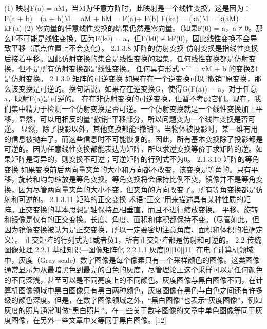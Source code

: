 (1) 映射F(a) = aM，当M为任意方阵时，此映射是一个线性变换，这是因为：
F(a + b)= (a + b)M = aM + bM = F(a)+ F(b)
F(ka) = (ka)M = k(aM) = kF(a)
(2) 零向量的任意线性变换的结果仍然是零向量。（如果F(0) = a，a ≠ 0。那么F不可能是线性变换。因为F(k0) = a，但F(k0) ≠ kF(0)，因此线性变换不会导致平移（原点位置上不会变化）。
2.1.3.8 矩阵的仿射变换
仿射变换是指线性变换后接着平移。因此仿射变换的集合是线性变换的超集，任何线性变换都是仿射变换，但不是所有仿射变换都是线性变换。
任何具有形式 v^'  = vM + b 的变换都是仿射变换。
2.1.3.9 矩阵的可逆变换
如果存在一个逆变换可以“撤销”原变换，那么该变换是可逆的。换句话说，如果存在逆变换G，使得G(F(a)) = a，对于任意a，映射F(a)是可逆的。
存在非仿射变换的可逆变换，但暂不考虑它们。现在，我们集中精力于检测一个仿射变换是否可逆。一个仿射变换就是一个线性变换加上平移，显然，可以用相反的量”撤销“平移部分，所以问题变为一个线性变换是否可逆。
显然，除了投影以外，其他变换都能“撤销”。当物体被投影时，某一维有用的信息被抛弃了，而这些信息时不可能恢复的。因此，所有基本变换除了投影都是可逆的。因为任意线性变换都能表达为矩阵，所以求逆变换等价于求矩阵的逆。如果矩阵是奇异的，则变换不可逆；可逆矩阵的行列式不为0。
2.1.3.10 矩阵的等角变换
如果变换前后两向量夹角的大小和方向都不改变，该变换是等角的。只有平移，旋转和均匀缩放是等角变换。等角变换将会保持比例不变，镜像并不是等角变换，因为尽管两向量夹角的大小不变，但夹角的方向改变了。所有等角变换都是仿射和可逆的。
2.1.3.11 矩阵的正交变换
术语“正交”用来描述具有某种性质的矩阵。正交变换的基本思想是轴保持互相垂直，而且不进行缩放变换。
平移、旋转和镜像是仅有的正交变换。长度、角度、面积和体积都保持不变。（尽管如此，但因为镜像变换被认为是正交变换，所以一定要密切注意角度、面积和体积的准确定义）。
正交矩阵的行列式为1或者负1，所有正交矩阵都是仿射和可逆的。
2.2 传统图像处理
2.2.1 基础知识---图像矩阵化
2.2.1.1 灰度[9][10][11]
	在电子计算机领域中，灰度（Gray scale）数字图像是每个像素只有一个采样颜色的图像。这类图像通常显示为从最暗黑色到最亮的白色的灰度，尽管理论上这个采样可以是任何颜色的不同深浅，甚至可以是不同亮度上的不同颜色。灰度图像与黑白图像不同，在计算机图像领域中黑白图像只有黑白两种颜色，灰度图像在黑色与白色之间还有许多级的颜色深度。但是，在数字图像领域之外，“黑白图像”也表示“灰度图像”，例如灰度的照片通常叫做“黑白照片”。在一些关于数字图像的文章中单色图像等同于灰度图像，在另外一些文章中又等同于黑白图像。[12]

